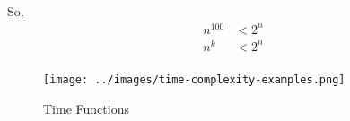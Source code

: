 \documentclass[]{article}
\begin{document}
So, 
\[
\begin{aligned}
    n^{100} &< 2^n \\
    n^k &< 2^n \\
\end{aligned}
\]

\begin{figure}[H]
    \centering
    \texttt{[image: ../images/time-complexity-examples.png]}
    \caption{Time Functions}
\end{figure}
\end{document}
